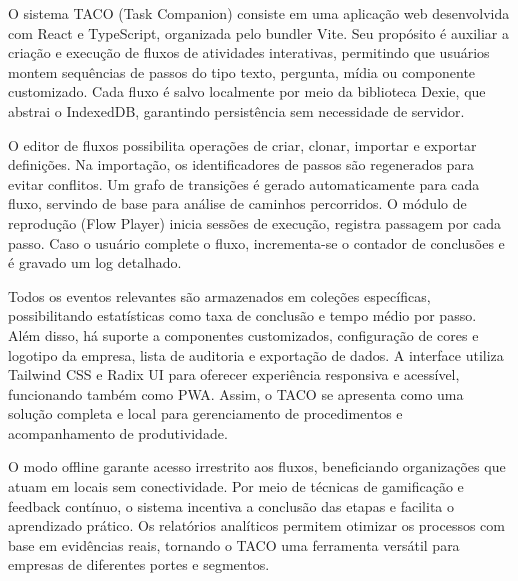 O sistema TACO (Task Companion) \cite{taco_repo} consiste em uma aplicação web desenvolvida com React e TypeScript, organizada pelo bundler Vite. Seu propósito é auxiliar a criação e execução de fluxos de atividades interativas, permitindo que usuários montem sequências de passos do tipo texto, pergunta, mídia ou componente customizado. Cada fluxo é salvo localmente por meio da biblioteca Dexie, que abstrai o IndexedDB, garantindo persistência sem necessidade de servidor.

O editor de fluxos possibilita operações de criar, clonar, importar e exportar definições. Na importação, os identificadores de passos são regenerados para evitar conflitos. Um grafo de transições é gerado automaticamente para cada fluxo, servindo de base para análise de caminhos percorridos. O módulo de reprodução (Flow Player) inicia sessões de execução, registra passagem por cada passo. Caso o usuário complete o fluxo, incrementa-se o contador de conclusões e é gravado um log detalhado.

Todos os eventos relevantes são armazenados em coleções específicas, possibilitando estatísticas como taxa de conclusão e tempo médio por passo. Além disso, há suporte a componentes customizados, configuração de cores e logotipo da empresa, lista de auditoria e exportação de dados. A interface utiliza Tailwind CSS e Radix UI para oferecer experiência responsiva e acessível, funcionando também como PWA. Assim, o TACO se apresenta como uma solução completa e local para gerenciamento de procedimentos e acompanhamento de produtividade.

O modo offline garante acesso irrestrito aos fluxos, beneficiando organizações que atuam em locais sem conectividade. Por meio de técnicas de gamificação e feedback contínuo, o sistema incentiva a conclusão das etapas e facilita o aprendizado prático. Os relatórios analíticos permitem otimizar os processos com base em evidências reais, tornando o TACO uma ferramenta versátil para empresas de diferentes portes e segmentos.
